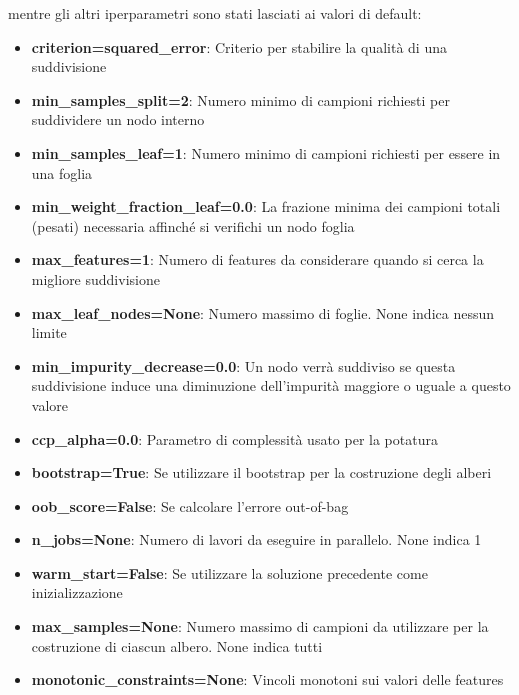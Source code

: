 \noindent mentre gli altri iperparametri sono stati lasciati ai valori di default:
\begin{itemize}
    \item \textbf{criterion=squared\_error}: Criterio per stabilire la qualità di una suddivisione
    \item \textbf{min\_samples\_split=2}: Numero minimo di campioni richiesti per suddividere un nodo interno
    \item \textbf{min\_samples\_leaf=1}: Numero minimo di campioni richiesti per essere in una foglia
    \item \textbf{min\_weight\_fraction\_leaf=0.0}: La frazione minima dei campioni totali (pesati) necessaria affinché si verifichi un nodo foglia
    \item \textbf{max\_features=1}: Numero di features da considerare quando si cerca la migliore suddivisione
    \item \textbf{max\_leaf\_nodes=None}: Numero massimo di foglie. None indica nessun limite
    \item \textbf{min\_impurity\_decrease=0.0}: Un nodo verrà suddiviso se questa suddivisione induce una diminuzione dell'impurità maggiore o uguale a questo valore
    \item \textbf{ccp\_alpha=0.0}: Parametro di complessità usato per la potatura
    \item \textbf{bootstrap=True}: Se utilizzare il bootstrap per la costruzione degli alberi
    \item \textbf{oob\_score=False}: Se calcolare l'errore out-of-bag
    \item \textbf{n\_jobs=None}: Numero di lavori da eseguire in parallelo. None indica 1
    \item \textbf{warm\_start=False}: Se utilizzare la soluzione precedente come inizializzazione
    \item \textbf{max\_samples=None}: Numero massimo di campioni da utilizzare per la costruzione di ciascun albero. None indica tutti
    \item \textbf{monotonic\_constraints=None}: Vincoli monotoni sui valori delle features
\end{itemize}
\newpage
